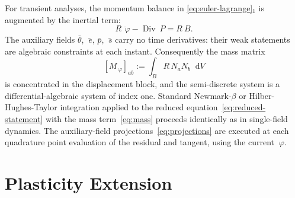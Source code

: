 \documentclass[12pt]{article}
\renewcommand{\P}{~P}
\newcommand{\ebar}{\bar{~e}}
\newcommand{\sbar}{\bar{~s}}
\newcommand{\thbar}{\bar{\theta}}
\newcommand{\pbar}{\bar{p}}
\DeclareMathOperator{\Div}{Div}
\newcommand*\diff{\mathop{}\!\mathrm{d}}
\begin{document}
For transient analyses, the momentum balance in
\eqref{eq:euler-lagrange}$_1$ is augmented by the inertial term:
\begin{equation}
  \label{eq:dynamic-momentum}
  R \, \ddot{~\varphi} - \Div \P = R ~B.
\end{equation}
The auxiliary fields $\thbar$, $\ebar$, $\pbar$, $\sbar$ carry no
time derivatives: their weak statements are algebraic constraints at
each instant. Consequently the mass matrix
\begin{equation}
  \label{eq:mass}
  \left[M_{~\varphi}\right]_{ab}
  :=
  \int_B R \, N_a N_b \diff V
\end{equation}
is concentrated in the displacement block, and the semi-discrete
system is a differential-algebraic system of index one. Standard
Newmark-$\beta$ or Hilber-Hughes-Taylor integration applied to the
reduced equation~\eqref{eq:reduced-statement} with the mass
term~\eqref{eq:mass} proceeds identically as in single-field
dynamics. The auxiliary-field projections~\eqref{eq:projections} are
executed at each quadrature point evaluation of the residual and
tangent, using the current $~\varphi$.


\section{Plasticity Extension}
\label{sec:plasticity}
\end{document}
